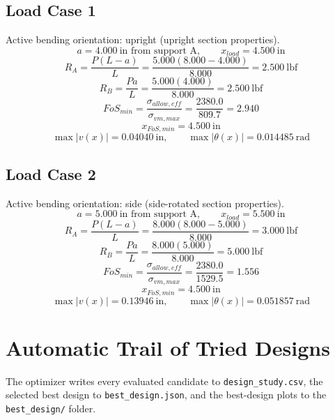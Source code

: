 \documentclass[11pt]{article}
\begin{document}
\subsection*{Load Case 1}
Active bending orientation: upright (upright section properties).
\[a = 4.000\ \mathrm{in} \text{ from support A}, \qquad x_{load} = 4.500\ \mathrm{in}\]
\[R_A = \frac{P(L-a)}{L} = \frac{5.000(8.000-4.000)}{8.000} = 2.500\ \mathrm{lbf}\]
\[R_B = \frac{Pa}{L} = \frac{5.000(4.000)}{8.000} = 2.500\ \mathrm{lbf}\]
\[FoS_{min} = \frac{\sigma_{allow,eff}}{\sigma_{vm,max}} = \frac{2380.0}{809.7} = 2.940\]
\[x_{FoS,min} = 4.500\ \mathrm{in}\]
\[\max |v(x)| = 0.04040\ \mathrm{in}, \qquad \max |\theta(x)| = 0.014485\ \mathrm{rad}\]
\subsection*{Load Case 2}
Active bending orientation: side (side-rotated section properties).
\[a = 5.000\ \mathrm{in} \text{ from support A}, \qquad x_{load} = 5.500\ \mathrm{in}\]
\[R_A = \frac{P(L-a)}{L} = \frac{8.000(8.000-5.000)}{8.000} = 3.000\ \mathrm{lbf}\]
\[R_B = \frac{Pa}{L} = \frac{8.000(5.000)}{8.000} = 5.000\ \mathrm{lbf}\]
\[FoS_{min} = \frac{\sigma_{allow,eff}}{\sigma_{vm,max}} = \frac{2380.0}{1529.5} = 1.556\]
\[x_{FoS,min} = 4.500\ \mathrm{in}\]
\[\max |v(x)| = 0.13946\ \mathrm{in}, \qquad \max |\theta(x)| = 0.051857\ \mathrm{rad}\]

\section*{Automatic Trail of Tried Designs}
The optimizer writes every evaluated candidate to \texttt{design\_study.csv}, the selected best design to \texttt{best\_design.json}, and the best-design plots to the \texttt{best\_design/} folder.
\end{document}

